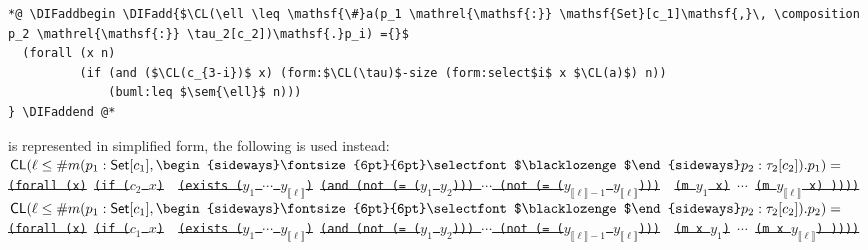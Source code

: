 \documentclass[10pt,fleqn,final]{scrreprt}
\newcommand*{\CL}{\ensuremath{\mathsf{CL}}\xspace}
\newcommand{\composition}{\raisebox{0.2pt}{\begin{sideways}\fontsize{6pt}{6pt}\selectfont$\blacklozenge$\end{sideways}}}
\newcommand{\sem}[1]{\mathopen\llbracket#1\mathclose\rrbracket}
\newcommand{\white}[1]{{\color{white}{#1}}}
\newcommand{\qqquad}{\white{x}\qquad}
\providecommand{\DIFadd}[1]{{\protect\color{blue}\uwave{#1}}} %
\providecommand{\DIFdel}[1]{{\protect\color{red}\sout{#1}}}                      %
\providecommand{\DIFaddbegin}{} %
\providecommand{\DIFaddend}{} %
\providecommand{\DIFdelbegin}{} %
\begin{document}
\begin{lstlisting}[language=clif, mathescape]
*@ \DIFaddbegin \DIFadd{$\CL(\ell \leq \mathsf{\#}a(p_1 \mathrel{\mathsf{:}} \mathsf{Set}[c_1]\mathsf{,}\, \composition p_2 \mathrel{\mathsf{:}} \tau_2[c_2])\mathsf{.}p_i) ={}$
  (forall (x n)
          (if (and ($\CL(c_{3-i})$ x) (form:$\CL(\tau)$-size (form:select$i$ x $\CL(a)$) n))
              (buml:leq $\sem{\ell}$ n)))
} \DIFaddend @*
\end{lstlisting}

\noindent \DIFaddbegin \DIFadd{If $a$
}\DIFaddend is represented in simplified form, the following is used instead:
\DIFdelbegin %
\DIFdel{$\CL(\ell \leq \mathsf{\#}m(p_1 \mathrel{\mathsf{:}} \mathsf{Set}[c_1]\mathsf{,}\, \composition p_2 \mathrel{\mathsf{:}} \tau_2[c_2])\mathsf{.}p_1)=$}%
\texttt{\DIFdel{(forall (x)}%
\DIFdel{(if ($c_2$ $x$) }%
\DIFdel{(exists ($y_1$ $\cdots$ $y_{\sem{\ell}}$)}%
\DIFdel{(and (not (= ($y_1$ $y_2$))) $\cdots$  (not (= ($y_{\sem{\ell}-1}$ $y_{\sem{\ell}}$))) }%
\DIFdel{(m $y_1$ x)}%
\DIFdel{$\cdots$}%
\DIFdel{(m $y_{\sem{\ell}}$ x) ))))}}%
\DIFdel{$\CL(\ell \leq \mathsf{\#}m(p_1 \mathrel{\mathsf{:}} \mathsf{Set}[c_1]\mathsf{,}\, \composition p_2 \mathrel{\mathsf{:}} \tau_2[c_2])\mathsf{.}p_2)=$}%
\texttt{\DIFdel{(forall (x)}%
\DIFdel{(if ($c_1$ $x$) }%
\DIFdel{(exists ($y_1$ $\cdots$ $y_{\sem{\ell}}$)}%
\DIFdel{(and (not (= ($y_1$ $y_2$))) $\cdots$  (not (= ($y_{\sem{\ell}-1}$ $y_{\sem{\ell}}$))) }%
\DIFdel{(m x  $y_1$)}%
\DIFdel{$\cdots$}%
\DIFdel{(m x $y_{\sem{\ell}}$) ))))}}
\end{document}
